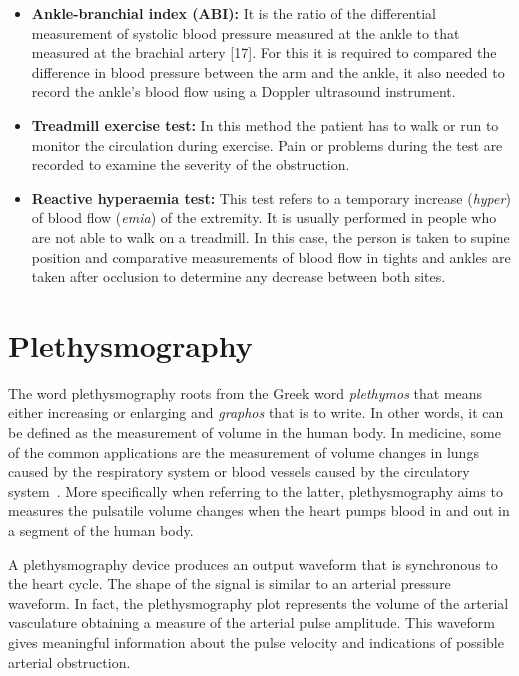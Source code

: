 \begin{itemize}
    \item \textbf{Ankle-branchial index (ABI):} It is the ratio of the differential measurement of systolic blood pressure measured at the ankle to that measured at the brachial artery [17]. For this it is required to compared the difference in blood pressure between the arm and the ankle, it also needed to record the ankle's blood flow using a Doppler ultrasound instrument.  
    \item \textbf{Treadmill exercise test: }In this method the patient has to walk or run to monitor the circulation during exercise. Pain or problems during the test are recorded to examine the severity of the obstruction.
    \item \textbf{Reactive hyperaemia test:} This test refers to a temporary increase (\textit{hyper}) of blood flow (\textit{emia}) of the extremity. It is usually performed in people who are not able to walk on a treadmill. In this case, the person is taken to supine position and comparative measurements of blood flow in tights and ankles are taken after occlusion to determine any decrease between both sites. 
\end{itemize}


\section{Plethysmography}
\label{section literature 3}
The word plethysmography roots from the Greek word \textit{plethymos} that means either increasing or enlarging and \textit{graphos} that is to write. In other words, it can be defined as the measurement of volume in the human body. In medicine, some of the common applications are the measurement of volume changes in lungs caused by the respiratory system or blood vessels caused by the circulatory system~\cite{turcott2004methods}.  More specifically when referring to the latter, plethysmography aims to measures the pulsatile volume changes when the heart pumps blood in and out in a segment of the human body. 


A plethysmography device produces an output waveform that is synchronous to the heart cycle. The shape of the signal is similar to an arterial pressure waveform. In fact, the plethysmography plot represents the volume of the arterial vasculature obtaining a measure of the arterial pulse amplitude. This waveform gives meaningful information about the pulse velocity and indications of possible arterial obstruction.

